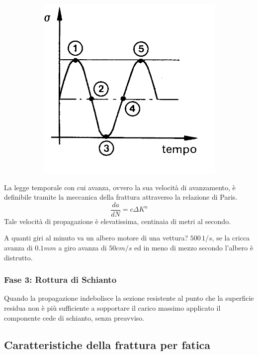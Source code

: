 \begin{figure}[H]
\begin{subfigure}{0.3\textwidth}
			\includegraphics[width=\linewidth]{immagini_10/screenshot009}
\label{fig:screenshot009}
			\end{subfigure}
		\end{figure}
		
		La legge temporale con cui avanza, ovvero la sua velocità di avanzamento, è definibile tramite la meccanica della frattura attraverso la relazione di Paris.
		\[\dfrac{da}{dN} = c\Delta K^n\] 
		Tale velocità di propagazione è elevatissima, centinaia di metri al secondo.
		
		A quanti giri al minuto va un albero motore di una vettura? $ 500\,1/s $, se la cricca avanza di $ 0.1 mm $ a giro avanza di $ 50 cm/s $ ed in meno di mezzo secondo l'albero è distrutto.  
		
\subsubsection{Fase 3: Rottura di Schianto}
		Quando la propagazione indebolisce la sezione resistente al punto che la superficie residua non è più sufficiente a sopportare il carico massimo applicato il componente cede di schianto, senza preavviso.
		
\subsection{Caratteristiche della frattura per fatica}
		
